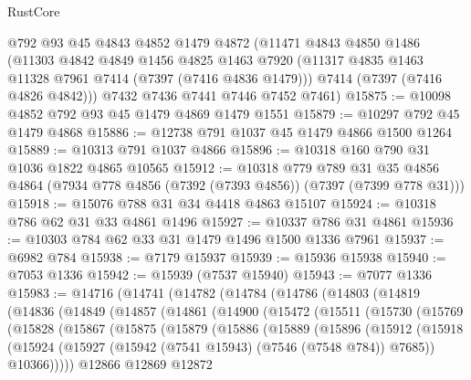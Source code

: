 \begin{lexlean}{RustCore}
\begin{coremodule}
    @792
    @93
    @45
    @4843
    @4852
    @1479
    @4872
    (@11471
      @4843
      @4850
      @1486
      (@11303
        @4842
        @4849
        @1456
        @4825
        @1463
        @7920
        (@11317 @4835 @1463 @11328 @7961 @7414 (@7397 (@7416 @4836 @1479)))
        @7414
        (@7397 (@7416 @4826 @4842)))
      @7432
      @7436
      @7441
      @7446
      @7452
      @7461)
@15875 := @10098 @4852 @792 @93 @45 @1479 @4869 @1479 @1551
@15879 := @10297 @792 @45 @1479 @4868
@15886 := @12738 @791 @1037 @45 @1479 @4866 @1500 @1264
@15889 := @10313 @791 @1037 @4866
@15896 := @10318 @160 @790 @31 @1036 @1822 @4865 @10565
@15912 := @10318
    @779
    @789
    @31
    @35
    @4856
    @4864
    (@7934 @778 @4856 (@7392 (@7393 @4856)) (@7397 (@7399 @778 @31)))
@15918 := @15076 @788 @31 @34 @4418 @4863 @15107
@15924 := @10318 @786 @62 @31 @33 @4861 @1496
@15927 := @10337 @786 @31 @4861
@15936 := @10303 @784 @62 @33 @31 @1479 @1496 @1500 @1336 @7961
@15937 := @6982 @784
@15938 := @7179 @15937
@15939 := @15936 @15938
@15940 := @7053 @1336
@15942 := @15939 (@7537 @15940)
@15943 := @7077 @1336
@15983 := @14716
    (@14741
      (@14782
        (@14784
          (@14786
            (@14803
              (@14819
                (@14836
                  (@14849
                    (@14857
                      (@14861
                        (@14900
                          (@15472
                            (@15511
                              (@15730
                                (@15769
                                  (@15828
                                    (@15867
                                      (@15875
                                        (@15879
                                          (@15886
                                            (@15889
                                              (@15896
                                                (@15912
                                                  (@15918
                                                    (@15924
                                                      (@15927
                                                        (@15942
                                                          (@7541 @15943)
                                                          (@7546 (@7548 @784))
                                                          @7685))
                                                      @10366)))))
                                            @12866
                                            @12869
                                            @12872

\end{coremodule}
\end{lexlean}
